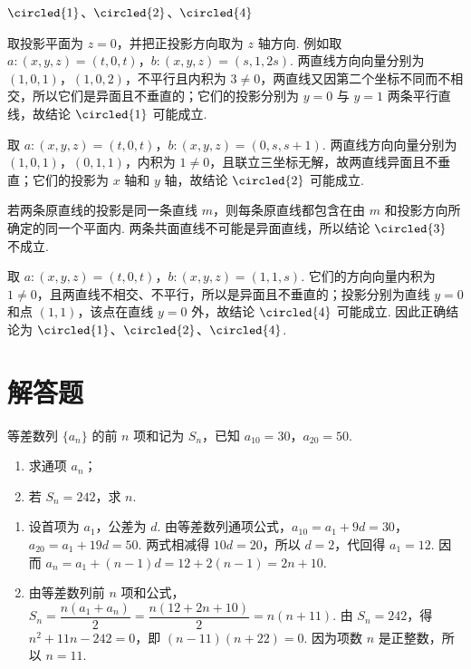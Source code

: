 \begin{answer}
\(\circled{1}\)、\(\circled{2}\)、\(\circled{4}\)
\end{answer}

\begin{solution}
取投影平面为 \(z=0\)，并把正投影方向取为 \(z\) 轴方向. 例如取 \(a:(x,y,z)=(t,0,t)\)，\(b:(x,y,z)=(s,1,2s)\). 两直线方向向量分别为 \((1,0,1)\)，\((1,0,2)\)，不平行且内积为 \(3\ne0\)，两直线又因第二个坐标不同而不相交，所以它们是异面且不垂直的；它们的投影分别为 \(y=0\) 与 \(y=1\) 两条平行直线，故结论 \(\circled{1}\) 可能成立.

取 \(a:(x,y,z)=(t,0,t)\)，\(b:(x,y,z)=(0,s,s+1)\). 两直线方向向量分别为 \((1,0,1)\)，\((0,1,1)\)，内积为 \(1\ne0\)，且联立三坐标无解，故两直线异面且不垂直；它们的投影为 \(x\) 轴和 \(y\) 轴，故结论 \(\circled{2}\) 可能成立.

若两条原直线的投影是同一条直线 \(m\)，则每条原直线都包含在由 \(m\) 和投影方向所确定的同一个平面内. 两条共面直线不可能是异面直线，所以结论 \(\circled{3}\) 不成立.

取 \(a:(x,y,z)=(t,0,t)\)，\(b:(x,y,z)=(1,1,s)\). 它们的方向向量内积为 \(1\ne0\)，且两直线不相交、不平行，所以是异面且不垂直的；投影分别为直线 \(y=0\) 和点 \((1,1)\)，该点在直线 \(y=0\) 外，故结论 \(\circled{4}\) 可能成立. 因此正确结论为 \(\circled{1}\)、\(\circled{2}\)、\(\circled{4}\).
\end{solution}

\section{解答题}

\begin{problem}
等差数列 \(\{a_n\}\) 的前 \(n\) 项和记为 \(S_n\)，已知 \(a_{10}=30\)，\(a_{20}=50\).

\begin{enumerate}
\item 求通项 \(a_n\)；
\item 若 \(S_n=242\)，求 \(n\).
\end{enumerate}
\end{problem}

\begin{solution}
\begin{enumerate}
\item 设首项为 \(a_1\)，公差为 \(d\). 由等差数列通项公式，\(a_{10}=a_1+9d=30\)，\(a_{20}=a_1+19d=50\). 两式相减得 \(10d=20\)，所以 \(d=2\)，代回得 \(a_1=12\). 因而 \(a_n=a_1+(n-1)d=12+2(n-1)=2n+10\).
\item 由等差数列前 \(n\) 项和公式，\(S_n=\dfrac{n(a_1+a_n)}2=\dfrac{n(12+2n+10)}2=n(n+11)\). 由 \(S_n=242\)，得 \(n^2+11n-242=0\)，即 \((n-11)(n+22)=0\). 因为项数 \(n\) 是正整数，所以 \(n=11\).
\end{enumerate}
\end{solution}

